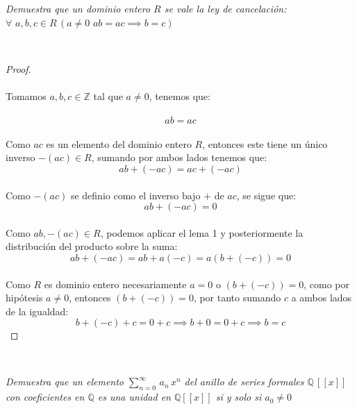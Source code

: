 \documentclass[11pt,letterpaper]{article}
\newcommand{\Z}{\mathbb{Z}}
\newcommand{\Q}{\mathbb{Q}}
\begin{document}
\newpage
\begin{tcolorbox}[
	title = \textcolor{black}{\textcolor{white}{Problema 5}},]
\textit{Demuestra que un dominio entero $R$ se vale la ley de cancelaci\'on:\,\,$\forall\,\,a,b,c\in R\,(a\neq 0\,\,ab=ac \implies b=c)$
}
\end{tcolorbox}\,\\
    \begin{proof}\,\\
    \,\\
    Tomamos  $a,b,c\in \Z$ tal que $a\neq 0$, tenemos que:\,\\
    \,\\
    \begin{equation*}
        ab=ac
    \end{equation*}\,\\
    Como $ac$ es un elemento del dominio entero $R$, entonces este tiene un \'unico inverso $-(ac)\in R$, sumando por ambos
    lados tenemos que:\,\\
    \begin{equation*}
        ab+(-ac)=ac+(-ac)
    \end{equation*}\,\\
    Como $-(ac)$ se definio como el inverso bajo $+$ de $ac$, se sigue que:\,\\
    \begin{equation*}
        ab+(-ac)=0
    \end{equation*}\,\\
    Como $ab,-(ac)\in R$, podemos aplicar el lema 1 y posteriormente la distribuci\'on del producto sobre la suma:\,\\
    \begin{equation*}
        ab+(-ac)=ab+a(-c)=a(b+(-c))=0
    \end{equation*}\,\\
    Como $R$ es dominio entero necesariamente $a=0$ o $(b+(-c))=0$, como por hip\'otesis $a\neq 0$, entonces
    $(b+(-c))=0$, por tanto sumando $c$ a ambos lados de la igualdad:\,\\
    \begin{equation*}
        b+(-c)+c=0+c\implies b+0=0+c\implies b=c
    \end{equation*}
\end{proof}\,\\
\newpage
\begin{tcolorbox}[
	title = \textcolor{black}{\textcolor{white}{Problema 6}},]
\textit{Demuestra que un elemento $\displaystyle \sum_{n=0}^{\infty}\,a_n\,x^n$ del anillo de series formales $\Q\,[[x]]$
con coeficientes en $\Q$ es una unidad en $\Q[[x]]$ si y solo si $a_0\neq 0$
}
\end{tcolorbox}\,\\
\end{document}
